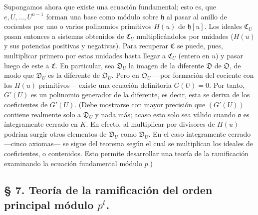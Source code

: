 Supongamos ahora que existe una ecuación fundamental; esto es, que $e,U,\ldots,U^{n-1}$ forman una base como módulo sobre $\mathfrak h$ al pasar al anillo de cocientes por uno o varios polinomios primitivos $H(u)$ de $\mathfrak h[u]$. Los ideales $\mathfrak C_U$ pasan entonces a sistemas obtenidos de $\mathfrak C_U$ multiplicándolos por unidades ($H(u)$ y sus potencias positivas y negativas). Para recuperar $\mathfrak C$ se puede, pues, multiplicar primero por estas unidades hasta llegar a $\mathfrak C_U$ (entero en $u$) y pasar luego de este a $\mathfrak C$. En particular, sea $\mathfrak D_U$ la imagen de la diferente $\mathfrak D$ de $\mathfrak O$, de modo que $\mathfrak D_U$ es la diferente de $\mathfrak O_U$. Pero en $\mathfrak O_U$ ---por formación del cociente con los $H(u)$ primitivos--- existe una ecuación definitoria $G(U)=0$. Por tanto, $G'(U)$ es un polinomio generador de la diferente, es decir, esta se deriva de los coeficientes de $G'(U)$. (Debe mostrarse con mayor precisión que $(G'(U))$ contiene realmente solo a $\mathfrak D_U$ y nada más; acaso esto solo sea válido cuando $\mathfrak o$ es íntegramente cerrado en $K$. En efecto, al multiplicar por divisores de $H(u)$ podrían surgir otros elementos de $\mathfrak D_U$ como $\mathfrak D_U$. En el caso íntegramente cerrado ---cinco axiomas--- se sigue del teorema según el cual se multiplican los ideales de coeficientes, o contenidos. Esto permite desarrollar una teoría de la ramificación examinando la ecuación fundamental módulo $p$.)

\subsection*{\S{} 7. Teoría de la ramificación del orden principal módulo $p^t$.}

